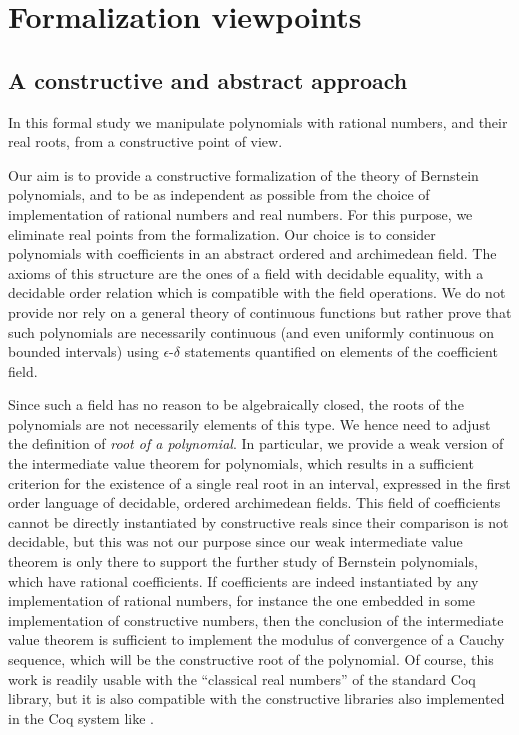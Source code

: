 \documentclass{mscs}
\begin{document}
\section{Formalization viewpoints}
\label{sec:rational}

\subsection{A constructive and abstract approach}
In this formal study we manipulate polynomials with rational numbers,
and their real roots, from a constructive point of view.

Our aim is to provide a constructive formalization of the theory of
Bernstein polynomials, and to be as independent as possible from the
choice of implementation of rational numbers and real numbers. For this
purpose, we eliminate real points from the formalization. Our choice
is to consider polynomials with coefficients in an abstract ordered and
archimedean field. The axioms of this structure are the ones of a
field with decidable equality, with a decidable order relation which is
compatible with the field operations. We do not provide
nor rely on a general theory of continuous functions but rather prove
that such polynomials are necessarily continuous (and even uniformly
continuous on bounded intervals) using $\epsilon$-$\delta$ statements
quantified on elements of the coefficient field.

Since such a field has no reason
to be algebraically closed, the roots of the polynomials are not
necessarily elements of this type. We hence need to adjust the
definition of {\em root of a polynomial}. In particular, we provide a
weak version of the intermediate value theorem for polynomials, which
results in a sufficient criterion for the existence of a single real root in
an interval, expressed in the first order language of decidable, ordered
archimedean fields. This field of coefficients cannot be directly
instantiated by constructive reals since their comparison is not
decidable, but this was not our purpose since our weak intermediate
value theorem is only there to support the further study of Bernstein
polynomials, which have rational coefficients. If coefficients are
indeed instantiated by any implementation of
rational numbers, for instance the one embedded in some implementation
of constructive numbers, then the conclusion of the intermediate
value theorem is sufficient to implement the modulus of convergence of
a Cauchy sequence, which will be the constructive root of the
polynomial. Of course, this work is readily usable  with the
``classical real numbers'' of the standard Coq library, but it is also
compatible with the constructive libraries also implemented in the Coq
system like \cite{DBLP:conf/mkm/Cruz-FilipeGW04, russellreals,
  russellcoqreals}.
\end{document}

